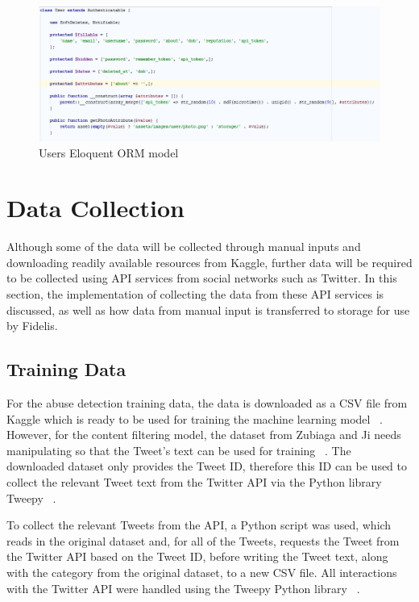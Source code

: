 \begin{figure}[H]
	\centering
	\includegraphics[width=1.0\textwidth]{Images/Implementation/UserModel}
	\caption{Users Eloquent ORM model} \label{fig:UserModel}
\end{figure}

\section{Data Collection}
Although some of the data will be collected through manual inputs and downloading readily available resources from Kaggle, further data will be required to be collected using API services from social networks such as Twitter. In this section, the implementation of collecting the data from these API services is discussed, as well as how data from manual input is transferred to storage for use by Fidelis.

\subsection{Training Data}
For the abuse detection training data, the data is downloaded as a CSV file from Kaggle which is ready to be used for training the machine learning model ~\cite{Kaggle:Dataset}. However, for the content filtering model, the dataset from Zubiaga and Ji needs manipulating so that the Tweet's text can be used for training ~\cite{Zubiaga:Tweets}. The downloaded dataset only provides the Tweet ID, therefore this ID can be used to collect the relevant Tweet text from the Twitter API via the Python library Tweepy ~\cite{Tweepy}.

To collect the relevant Tweets from the API, a Python script was used, which reads in the original dataset and, for all of the Tweets, requests the Tweet from the Twitter API based on the Tweet ID, before writing the Tweet text, along with the category from the original dataset, to a new CSV file. All interactions with the Twitter API were handled using the Tweepy Python library ~\cite{Tweepy}. 

